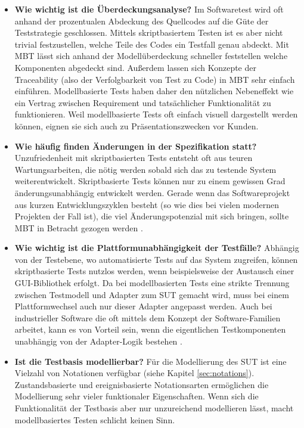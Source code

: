 \begin{itemize}
\item \textbf{Wie wichtig ist die Überdeckungsanalyse?}
Im Softwaretest wird oft anhand der prozentualen Abdeckung des Quellcodes auf die Güte der Teststrategie geschlossen. Mittels skriptbasiertem Testen ist es aber nicht trivial festzustellen, welche Teile des Codes ein Testfall genau abdeckt. Mit \Gls{MBT} lässt sich anhand der Modellüberdeckung schneller feststellen welche Komponenten abgedeckt sind. Außerdem lassen sich Konzepte der Traceability (also der Verfolgbarkeit von Test zu Code) in \Gls{MBT} sehr einfach einführen. Modellbasierte Tests haben daher den nützlichen Nebeneffekt wie ein Vertrag zwischen Requirement und tatsächlicher Funktionalität zu funktionieren. Weil modellbasierte Tests oft einfach visuell dargestellt werden können, eignen sie sich auch zu Präsentationszwecken vor Kunden.
\item \textbf{Wie häufig finden Änderungen in der Spezifikation statt?} 
Unzufriedenheit mit skriptbasierten Tests entsteht oft aus teuren Wartungsarbeiten, die nötig werden sobald sich das zu testende System weiterentwickelt. Skriptbasierte Tests können nur zu einem gewissen Grad änderungsunabhängig entwickelt werden. Gerade wenn das Softwareprojekt aus kurzen Entwicklungszyklen besteht (so wie dies bei vielen modernen Projekten der Fall ist), die viel Änderungspotenzial mit sich bringen, sollte \Gls{MBT} in Betracht gezogen werden \cite{utting_practical_2007}.
\item \textbf{Wie wichtig ist die Plattformunabhängigkeit der Testfälle?}
Abhängig von der Testebene, wo automatisierte Tests auf das System zugreifen, können skriptbasierte Tests nutzlos werden, wenn beispielsweise der Austausch einer GUI-Bibliothek erfolgt. Da bei modellbasierten Tests eine strikte Trennung zwischen Testmodell und Adapter zum \Gls{SUT} gemacht wird, muss bei einem Plattformwechsel auch nur dieser Adapter angepasst werden. Auch bei industrieller Software die oft mittels dem Konzept der Software-Familien arbeitet, kann es von Vorteil sein, wenn die eigentlichen Testkomponenten unabhängig von der Adapter-Logik bestehen \cite{graham_experiences_2012}.
\item \textbf{Ist die Testbasis modellierbar?}
Für die Modellierung des \Gls{SUT} ist eine Vielzahl von Notationen verfügbar (siehe Kapitel \ref{sec:notations}). Zustandsbasierte und ereignisbasierte Notationsarten ermöglichen die Modellierung sehr vieler funktionaler Eigenschaften. Wenn sich die Funktionalität der Testbasis aber nur unzureichend modellieren lässt, macht modellbasiertes Testen schlicht keinen Sinn.

\end{itemize}
